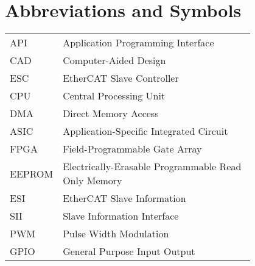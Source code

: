 \chapter*{Abbreviations and Symbols}

\begin{flushleft}
\begin{tabular}{l p{0.8\linewidth}}
API      & Application Programming Interface\\
CAD      & Computer-Aided Design\\
ESC      & EtherCAT Slave Controller\\
CPU      & Central Processing Unit\\
DMA      & Direct Memory Access\\
ASIC     & Application-Specific Integrated Circuit\\
FPGA     & Field-Programmable Gate Array\\
EEPROM   & Electrically-Erasable Programmable Read Only Memory\\
ESI      & EtherCAT Slave Information\\
SII      & Slave Information Interface\\
PWM      & Pulse Width Modulation\\
GPIO     & General Purpose Input Output\\
\end{tabular}
\end{flushleft}

